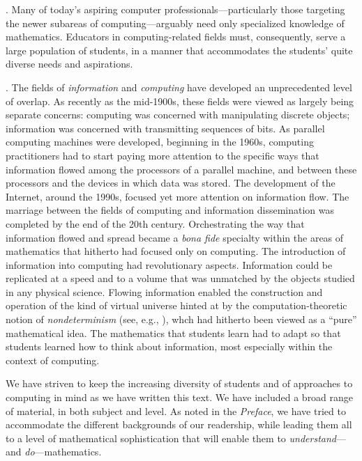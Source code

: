 .
Many of today's aspiring computer professionals---particularly those
targeting the newer subareas of computing---arguably need only
specialized knowledge of mathematics.  Educators in computing-related
fields must, consequently, serve a large population of students, in a
manner that accommodates the students' quite diverse needs and
aspirations.

.
The fields of {\it information}  and
{\em computing} have developed an unprecedented level of overlap.  As
recently as the mid-1900s, these fields were viewed as largely being
separate concerns: computing was concerned with manipulating discrete
objects; information was concerned with transmitting sequences of
bits.  As parallel computing machines were developed, beginning in the
1960s, computing practitioners had to start paying more attention to
the specific ways that information flowed among the processors of a
parallel machine, and between these processors and the devices in
which data was stored.  The development of the Internet, around the
1990s, focused yet more attention on information flow.  The marriage
between the fields of computing and information dissemination was
completed by the end of the 20th century.  Orchestrating the way that
information flowed and spread became a {\it bona fide} specialty
within the areas of mathematics that hitherto had focused only on
computing.  The introduction of information into computing had
revolutionary aspects.  Information could be replicated at a speed and
to a volume that was unmatched by the objects studied in any physical
science.  Flowing information enabled the construction and operation
of the kind of virtual universe hinted at by the computation-theoretic
notion of {\it nondeterminism}  (see, e.g.,
\cite{Rosenberg09}), whch had hitherto been viewed as a ``pure''
mathematical idea.  The mathematics that students learn had to adapt
so that students learned how to think about information, most
especially within the context of computing.


\bigskip

We have striven to keep the increasing diversity of students and of
approaches to computing in mind as we have written this text.  We have
included a broad range of material, in both subject and level.  As
noted in the {\it Preface}, we have tried to accommodate the different
backgrounds of our readership, while leading them all to a level of
mathematical sophistication that will enable them to {\em
  understand}---and {\em do}---mathematics.

